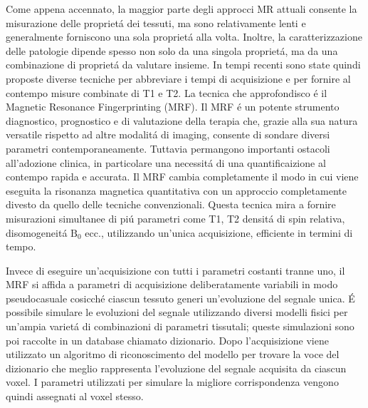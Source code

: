 \documentclass[a4paper,10pt]{article}
\begin{document}
 Come appena accennato, la maggior parte degli approcci MR attuali consente la misurazione delle propriet\'a dei tessuti, ma sono relativamente lenti e generalmente forniscono una sola propriet\'a alla volta. Inoltre, la caratterizzazione delle patologie dipende spesso non solo da una singola propriet\'a, ma da una combinazione di propriet\'a da valutare insieme. In tempi recenti sono state quindi proposte diverse tecniche per abbreviare i tempi di acquisizione e per fornire al contempo misure combinate di T1 e T2. La tecnica che approfondisco \'e il Magnetic Resonance Fingerprinting (MRF). Il MRF \'e un potente strumento diagnostico, prognostico e di valutazione della terapia che, grazie alla sua natura versatile rispetto ad altre modalit\'a di imaging, consente di sondare diversi parametri contemporaneamente. Tuttavia permangono importanti ostacoli all'adozione clinica, in particolare una necessit\'a di una quantificaizione al contempo rapida e accurata. Il MRF cambia completamente il modo in cui viene eseguita la risonanza magnetica quantitativa con un approccio completamente divesto da quello delle tecniche convenzionali. Questa tecnica mira a fornire misurazioni simultanee di pi\'u parametri come T1, T2 densit\'a di spin relativa, disomogeneit\'a $\mbox{B}_0$ ecc., utilizzando un'unica acquisizione, efficiente in termini di tempo. 
 
 Invece di eseguire un'acquisizione con tutti i parametri costanti tranne uno, il MRF si affida a parametri di acquisizione deliberatamente variabili in modo pseudocasuale cosicch\'e ciascun tessuto generi un'evoluzione del segnale unica. \'E possibile simulare le evoluzioni del segnale utilizzando diversi modelli fisici per un'ampia variet\'a di combinazioni di parametri tissutali; queste simulazioni sono poi raccolte in un database chiamato dizionario. Dopo l'acquisizione viene utilizzato un algoritmo di riconoscimento del modello per trovare la voce del dizionario che meglio rappresenta l'evoluzione del segnale acquisita da ciascun voxel. I parametri utilizzati per simulare la migliore corrispondenza vengono quindi assegnati al voxel stesso. 
 
\end{document}
